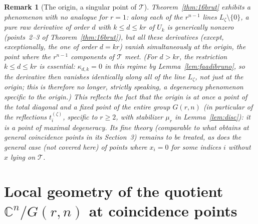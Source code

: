 \documentclass[10pt,a4paper]{amsart}
\newtheorem{remark}[theorem]{Remark}
\newcommand{\CC}{\mathbb{C}}
\begin{document}
\begin{remark}[The origin, a singular point of $\mathcal T$]
Theorem~\ref{thm:16brut} exhibits a phenomenon with no analogue for $r=1$: along each of the $r^{n-1}$ lines $L_\zeta\setminus\{0\}$, a pure raw derivative of order $d$ with $k\le d\le kr$ of $U_k$ is generically nonzero (points~2--3 of Theorem~\ref{thm:16brut}), but \emph{all} these derivatives (except, exceptionally, the one of order $d=kr$) vanish simultaneously at the origin, the point where the $r^{n-1}$ components of $\mathcal T$ meet. (For $d>kr$, the restriction $k\le d\le kr$ is essential: $\kappa_{d,k}=0$ in this regime by Lemma~\ref{lem:faadibruno}, so the derivative then vanishes identically along \emph{all} of the line $L_\zeta$, not just at the origin; this is therefore no longer, strictly speaking, a degeneracy phenomenon specific to the origin.) This reflects the fact that the origin is at once a point of the total diagonal \emph{and} a fixed point of the entire group $G(r,n)$ (in particular of the reflections $t_i^{(\zeta)}$, specific to $r\ge2$, with stabilizer $\mu_r$ in Lemma~\ref{lem:disc}): it is a point of maximal degeneracy. Its fine theory (comparable to what \cite{Ze} obtains at general coincidence points in its Section~3) remains to be treated, as does the general case (not covered here) of points where $x_i=0$ for some indices $i$ without $x$ lying on $\mathcal T$.
\end{remark}

\section{Local geometry of the quotient $\CC^n/G(r,n)$ at coincidence points}\label{sec:trois-points}
\end{document}
